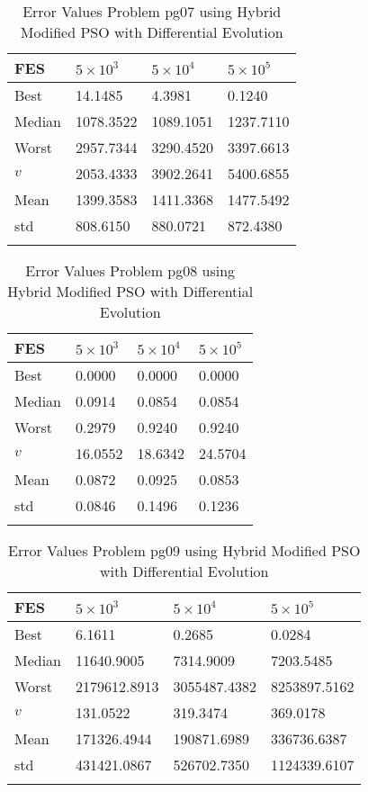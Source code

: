 \documentclass[10pt, a4paper]{book}
\begin{document}
\begin{center}
\begin{longtable}{l l l l}
FES & $5 \times 10^{3}$ & $5 \times 10^{4}$ & $5 \times 10^{5}$ \\
\hline
Best & 14.1485 & 4.3981 & 0.1240 \\
Median & 1078.3522 & 1089.1051 & 1237.7110 \\
Worst & 2957.7344 & 3290.4520 & 3397.6613 \\
$v$ & 2053.4333 & 3902.2641 & 5400.6855 \\
Mean & 1399.3583 & 1411.3368 & 1477.5492 \\
std & 808.6150 & 880.0721 & 872.4380 \\
\caption{ Error Values Problem pg07 using Hybrid Modified PSO with Differential Evolution }
\end{longtable}
\end{center}

\begin{center}
\begin{longtable}{l l l l}
FES & $5 \times 10^{3}$ & $5 \times 10^{4}$ & $5 \times 10^{5}$ \\
\hline
Best & 0.0000 & 0.0000 & 0.0000 \\
Median & 0.0914 & 0.0854 & 0.0854 \\
Worst & 0.2979 & 0.9240 & 0.9240 \\
$v$ & 16.0552 & 18.6342 & 24.5704 \\
Mean & 0.0872 & 0.0925 & 0.0853 \\
std & 0.0846 & 0.1496 & 0.1236 \\
\caption{ Error Values Problem pg08 using Hybrid Modified PSO with Differential Evolution }
\end{longtable}
\end{center}

\begin{center}
\begin{longtable}{l l l l}
FES & $5 \times 10^{3}$ & $5 \times 10^{4}$ & $5 \times 10^{5}$ \\
\hline
Best & 6.1611 & 0.2685 & 0.0284 \\
Median & 11640.9005 & 7314.9009 & 7203.5485 \\
Worst & 2179612.8913 & 3055487.4382 & 8253897.5162 \\
$v$ & 131.0522 & 319.3474 & 369.0178 \\
Mean & 171326.4944 & 190871.6989 & 336736.6387 \\
std & 431421.0867 & 526702.7350 & 1124339.6107 \\
\caption{ Error Values Problem pg09 using Hybrid Modified PSO with Differential Evolution }
\end{longtable}
\end{center}
\end{document}
